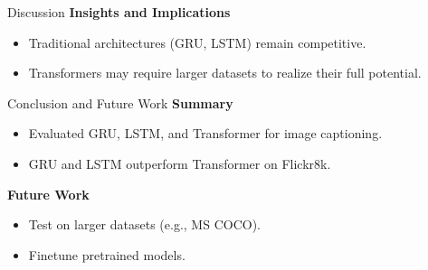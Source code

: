 \documentclass[10pt]{beamer}
\theoremstyle{remark}
\begin{document}
\begin{frame}{Discussion}
	\textbf{Insights and Implications}
	\begin{itemize}
		\item Traditional architectures (GRU, LSTM) remain competitive.
		\item Transformers may require larger datasets to realize their full potential.
	\end{itemize}
\end{frame}

\begin{frame}{Conclusion and Future Work}
	\textbf{Summary}
	\begin{itemize}
		\item Evaluated GRU, LSTM, and Transformer for image captioning.
		\item GRU and LSTM outperform Transformer on Flickr8k.
	\end{itemize}
	\textbf{Future Work}
	\begin{itemize}
		\item Test on larger datasets (e.g., MS COCO).
		\item Finetune pretrained models.
	\end{itemize}
\end{frame}
\end{document}
